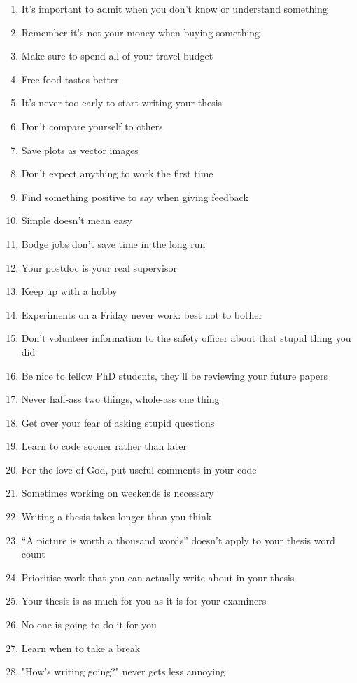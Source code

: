 \begin{enumerate}
	\item It's important to admit when you don't know or understand something
	\item Remember it's not your money when buying something
	\item Make sure to spend all of your travel budget
	\item Free food tastes better
	\item It's never too early to start writing your thesis
	\item Don't compare yourself to others
	\item Save plots as vector images
	\item Don't expect anything to work the first time
	\item Find something positive to say when giving feedback
	\item Simple doesn't mean easy
	\item Bodge jobs don't save time in the long run
	\item Your postdoc is your real supervisor
	\item Keep up with a hobby
	\item Experiments on a Friday never work: best not to bother
	\item Don't volunteer information to the safety officer about that stupid thing you did 
	\item Be nice to fellow PhD students, they'll be reviewing your future papers
	\item Never half-ass two things, whole-ass one thing
	\item Get over your fear of asking stupid questions
	\item Learn to code sooner rather than later
	\item For the love of God, put useful comments in your code
	\item Sometimes working on weekends is necessary
	\item Writing a thesis takes longer than you think
	\item ``A picture is worth a thousand words'' doesn't apply to your thesis word count
	\item Prioritise work that you can actually write about in your thesis
	\item Your thesis is as much for you as it is for your examiners 
	\item No one is going to do it for you
	\item Learn when to take a break
	\item "How's writing going?" never gets less annoying

\end{enumerate}
